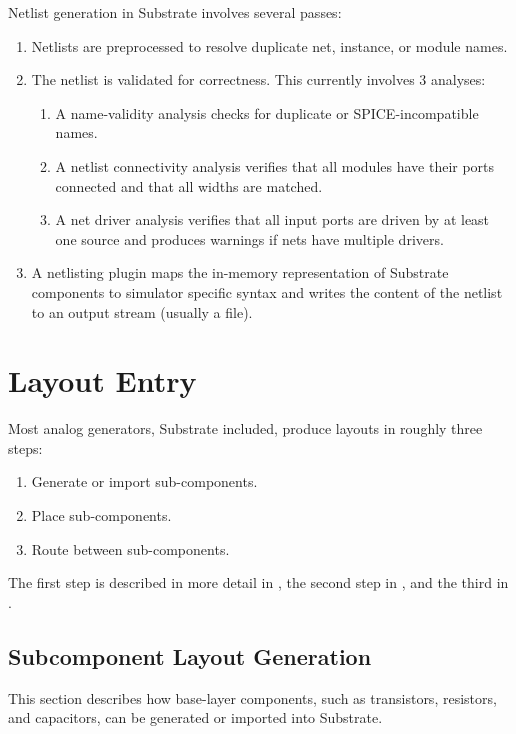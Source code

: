 Netlist generation in Substrate involves several passes:
\begin{enumerate}
\item Netlists are preprocessed to resolve duplicate net, instance, or module names.
\item The netlist is validated for correctness. This currently involves 3 analyses:
\begin{enumerate}
  \item A name-validity analysis checks for duplicate or SPICE-incompatible names.
  \item A netlist connectivity analysis verifies that all modules have their ports connected and that all widths are matched.
  \item A net driver analysis verifies that all input ports are driven by at least one source and produces warnings if nets have multiple drivers.
\end{enumerate}
\item A netlisting plugin maps the in-memory representation of Substrate components to simulator specific syntax and writes the content of the netlist to an output stream (usually a file).
\end{enumerate}

\section{Layout Entry} \label{sec:layout-entry}

Most analog generators, Substrate included, produce layouts in roughly three steps:
\begin{enumerate}
\item Generate or import sub-components.
\item Place sub-components.
\item Route between sub-components.
\end{enumerate}

The first step is described in more detail in ,
the second step in , and the third in .

\subsection{Subcomponent Layout Generation} \label{sec:subcomponent-layout-generation}

This section describes how base-layer components, such as transistors, resistors, and capacitors, can be generated or imported into Substrate.

